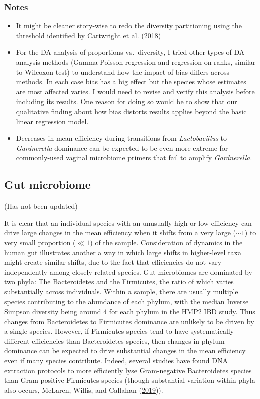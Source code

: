 \documentclass[
]{article}
\providecommand{\tightlist}{%
  \setlength{\itemsep}{0pt}\setlength{\parskip}{0pt}}
\begin{document}
\hypertarget{notes}{%
\subsubsection{Notes}\label{notes}}

\begin{itemize}
\tightlist
\item
  It might be cleaner story-wise to redo the diversity partitioning using the threshold identified by Cartwright et al. (\protect\hyperlink{ref-cartwright2018mult}{2018})
\item
  For the DA analysis of proportions vs.~diversity, I tried other types of DA analysis methods (Gamma-Poisson regression and regression on ranks, similar to Wilcoxon test) to understand how the impact of bias differs across methods. In each case bias has a big effect but the species whose estimates are most affected varies. I would need to revise and verify this analysis before including its results. One reason for doing so would be to show that our qualitative finding about how bias distorts results applies beyond the basic linear regression model.
\item
  Decreases in mean efficiency during transitions from \emph{Lactobacillus} to \emph{Gardnerella} dominance can be expected to be even more extreme for commonly-used vaginal microbiome primers that fail to amplify \emph{Gardnerella}.
\end{itemize}

\hypertarget{gut-microbiome}{%
\subsection{Gut microbiome}\label{gut-microbiome}}

(Has not been updated)

It is clear that an individual species with an unusually high or low efficiency can drive large changes in the mean efficiency when it shifts from a very large (\(\sim 1\)) to very small proportion (\(\ll 1\)) of the sample.
Consideration of dynamics in the human gut illustrates another a way in which large shifts in higher-level taxa might create similar shifts, due to the fact that efficiencies do not vary independently among closely related species.
Gut microbiomes are dominated by two phyla: The Bacteroidetes and the Firmicutes, the ratio of which varies substantially across individuals.
Within a sample, there are usually multiple species contributing to the abundance of each phylum, with the median Inverse Simpson diversity being around 4 for each phylum in the HMP2 IBD study.
Thus changes from Bacteroidetes to Firmicutes dominance are unlikely to be driven by a single species.
However, if Firmicutes species tend to have systematically different efficiencies than Bacteroidetes species, then changes in phylum dominance can be expected to drive substantial changes in the mean efficiency even if many species contribute.
Indeed, several studies have found DNA extraction protocols to more efficiently lyse Gram-negative Bacteroidetes species than Gram-positive Firmicutes species (though substantial variation within phyla also occurs, McLaren, Willis, and Callahan (\protect\hyperlink{ref-mclaren2019cons}{2019})).
\end{document}
